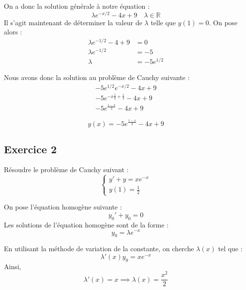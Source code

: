 \documentclass{article}
\begin{document}
On a donc la solution générale à notre équation :
\begin{equation*}
\lambda e^{-x/2} -4x+9\quad \lambda\in \mathbb{R}
\end{equation*}
Il s'agit maintenant de déterminer la valeur de $\lambda$ telle que $y(1)=0$.
On pose alors : 
\begin{equation*}
\begin{aligned}
\lambda e^{-1/2} -4+9 &= 0 \\
\lambda e^{-1/2}  &= -5 \\
\lambda   &= -5e^{1/2} 
\end{aligned}
\end{equation*}

Nous avons donc la solution au problème de Cauchy suivante :
\begin{equation*}
\begin{gathered}
 -5e^{1/2}e^{-x/2} -4x+9 \\
 -5e^{-x\frac{1}{2} + \frac{1}{2}} -4x+9 \\
 -5e^{\frac{1-x}{2}} -4x+9 
\end{gathered}
\end{equation*}

\begin{equation*}
y(x) = -5e^{\frac{1-x}{2}} -4x+9 
\end{equation*}

\subsection{Exercice 2}

Résoudre le problème de Cauchy suivant :
\begin{equation*}
\begin{cases}
y' + y = xe^{-x}\\
y(1)=\frac{1}{2}
\end{cases}
\end{equation*}

On pose l'équation homogène suivante :
\begin{equation*}
y_{0}' + y_{0} = 0
\end{equation*}
Les solutions de l'équation homogène sont de la forme :
\begin{equation*}
y_{0} = \lambda e^{-x}
\end{equation*}

En utilisant la méthode de variation de la constante, on cherche $\lambda(x)$ tel que :
\begin{equation*}
\lambda'(x)y_{0} = xe^{-x}
\end{equation*}
Ainsi,
\begin{equation*}
\lambda'(x) = x \implies \lambda(x) = \frac{x^2}{2}
\end{equation*}
\end{document}
